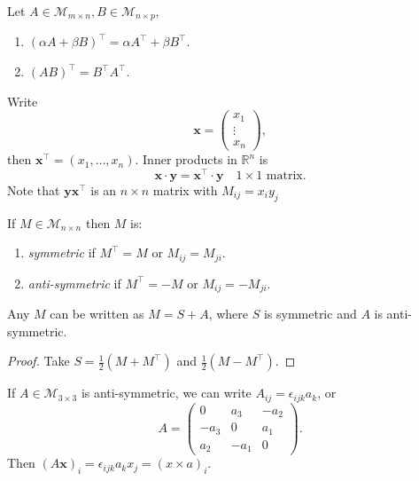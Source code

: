 \documentclass[10pt]{article}
\begin{document}
    \begin{proposition}[Properties]
        Let $ A\in \mathcal{M}_{m\times n}, B\in \mathcal{M}_{n\times p} $,
        \begin{enumerate}
            \item $ (\alpha A+\beta B)^{\top}=\alpha A^{\top}+\beta B^{\top} $.
            \item $ (AB)^{\top}=B^{\top}A^{\top} $.
        \end{enumerate}
    \end{proposition}
    \begin{remark}
        Write 
        \[
            \mathbf{x}=\begin{pmatrix}
                x_1\\\vdots\\x_n
            \end{pmatrix}
        ,\]
        then $ \mathbf{x}^{\top}=(x_1,\dots,x_n) $. Inner products in $ \mathbb{R}^{n} $ is 
        \[
            \mathbf{x}\cdot \mathbf{y}=\mathbf{x}^{\top} \cdot \mathbf{y}\quad 1 \times 1 \text{ matrix}
        .\]
        Note that $ \mathbf{y}\mathbf{x}^{\top} $ is an $ n \times n $ matrix with $ M_{ij}=x_iy_j $
    \end{remark}
    \begin{definition}
        If $ M\in \mathcal{M}_{n\times n} $ then $M$ is:
        \begin{enumerate}
            \item \textit{symmetric} if $ M^{\top}=M $ or $ M_{ij}=M_{ji} $.
            \item \textit{anti-symmetric} if $ M^{\top}=-M $ or $ M_{ij}=-M_{ji} $.
        \end{enumerate}
    \end{definition}
    \begin{proposition}
        Any $ M $ can be written as $ M=S+A $, where $S$ is symmetric and $A$ is anti-symmetric.
    \end{proposition}
    \begin{proof}
        Take $ S=\frac{1}{2}(M+M^{\top}) $ and $ \frac{1}{2}(M-M^{\top}) $.
    \end{proof}
    \begin{remark}
        If $ A\in \mathcal{M}_{3\times 3} $ is anti-symmetric, we can write $ A_{ij}=\epsilon_{ijk}a_k $, or 
        \[
            A=\begin{pmatrix}
                0&a_3&-a_2\\
                -a_3&0&a_1\\
                a_2&-a_1&0
            \end{pmatrix}
        .\]
        Then $ (A \mathbf{x})_{i}=\epsilon_{ijk}a_kx_j=(x \times a)_{i} $.
    \end{remark}
\end{document}
